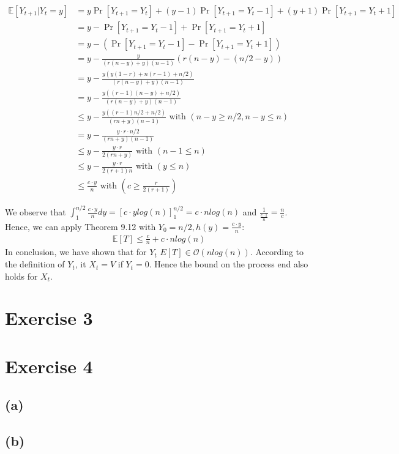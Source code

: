 \documentclass[a4paper,german]{article}
\newcommand{\E}{\mathbb{E}}
\begin{document}
\begin{align*}
	\E[Y_{t+1} | Y_t = y] &= y \Pr[Y_{t+1} = Y_t] + (y-1)\Pr[Y_{t+1} = Y_t - 1] + (y+1)\Pr[Y_{t+1} = Y_t + 1] \\
	&=y - \Pr[Y_{t+1} = Y_t - 1] + \Pr[Y_{t+1} = Y_t + 1] \\
	&=y - (\Pr[Y_{t+1} = Y_t - 1] - \Pr[Y_{t+1} = Y_t + 1]) \\
	&= y -\frac{y}{(r(n-y) +y) (n-1)} (r(n-y) - (n/2 - y)) \\
	&=  y - \frac{y (y(1-r) +n (r-1) + n/2)}{(r(n-y) +y) (n-1)} \\
	&=  y - \frac{y ((r-1)(n-y) + n/2)}{(r(n-y) +y) (n-1)} \\
	&\leq y - \frac{y ((r-1)n/2 + n/2)}{(rn +y) (n-1)} \text{ with } (n-y \geq n/2, n-y \leq n) \\
	&= y - \frac{y \cdot r \cdot n/2}{(rn +y) (n-1)}\\
	&\leq y - \frac{y \cdot r}{2(rn +y)} \text { with } (n-1 \leq n)\\
	&\leq y - \frac{y \cdot r}{2(r+1)n} \text { with } (y \leq n) \\
	&\leq \frac{c \cdot y}{n} \text { with } (c \geq \frac{r}{2(r+1)})
\end{align*}

We observe that \( \int_1^{n/2} \frac{c \cdot y}{n} dy =  \left[ c\cdot y log(n)\right]_1^{n/2} = c\cdot n log(n)\) and \(\frac{1}{\frac{c \cdot 1}{n}} = \frac{n}{c}\). Hence, we can apply Theorem 9.12 with \(Y_0 = n/2, h(y) = \frac{c \cdot y}{n}\):
\begin{align*}
	\E[T] \leq \frac{c}{n} + c\cdot n log(n)
\end{align*} 
In conclusion, we have shown that for \(Y_t\) \(E[T] \in \mathcal{O}(nlog(n))\). According to the definition of \(Y_t\), it \(X_t = V\) if \(Y_t = 0\). Hence the bound on the process end also holds for \(X_t\).
\section*{Exercise 3}
\section*{Exercise 4}
\subsection*{(a)}
\subsection*{(b)}
\end{document}
